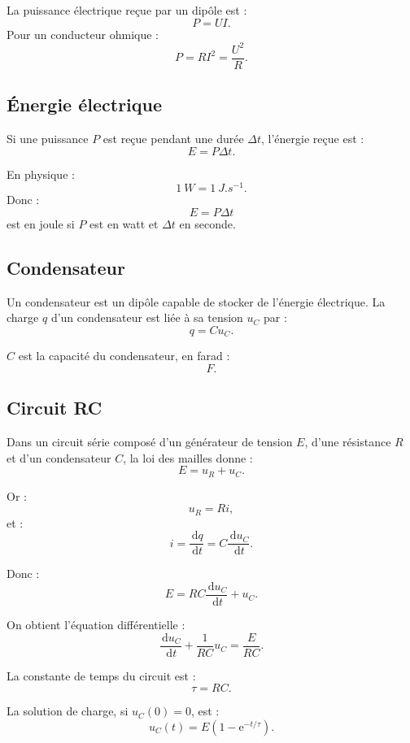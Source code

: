\documentclass[11pt,a4paper]{article}
\newcommand{\e}{\mathrm{e}}
\newcommand{\dd}{\,\mathrm{d}}
\begin{document}
\begin{propriete}
La puissance électrique reçue par un dipôle est :
\[
P=UI.
\]
Pour un conducteur ohmique :
\[
P=RI^2=\frac{U^2}{R}.
\]
\end{propriete}

\subsection{Énergie électrique}

Si une puissance $P$ est reçue pendant une durée $\Delta t$, l'énergie reçue est :
\[
E=P\Delta t.
\]

\begin{alerte}
En physique :
\[
\SI{1}{W}=\SI{1}{J.s^{-1}}.
\]
Donc :
\[
E=P\Delta t
\]
est en joule si $P$ est en watt et $\Delta t$ en seconde.
\end{alerte}

\subsection{Condensateur}

\begin{definition}
Un condensateur est un dipôle capable de stocker de l'énergie électrique.  
La charge $q$ d'un condensateur est liée à sa tension $u_C$ par :
\[
q=Cu_C.
\]
\end{definition}

$C$ est la capacité du condensateur, en farad :
\[
\si{F}.
\]

\subsection{Circuit RC}

Dans un circuit série composé d'un générateur de tension $E$, d'une résistance $R$ et d'un condensateur $C$, la loi des mailles donne :
\[
E=u_R+u_C.
\]

Or :
\[
u_R=Ri,
\]
et :
\[
i=\frac{\dd q}{\dd t}=C\frac{\dd u_C}{\dd t}.
\]

Donc :
\[
E=RC\frac{\dd u_C}{\dd t}+u_C.
\]

On obtient l'équation différentielle :
\[
\frac{\dd u_C}{\dd t}+\frac{1}{RC}u_C=\frac{E}{RC}.
\]

\begin{definition}
La constante de temps du circuit est :
\[
\tau=RC.
\]
\end{definition}

La solution de charge, si $u_C(0)=0$, est :
\[
u_C(t)=E\left(1-\e^{-t/\tau}\right).
\]
\end{document}
